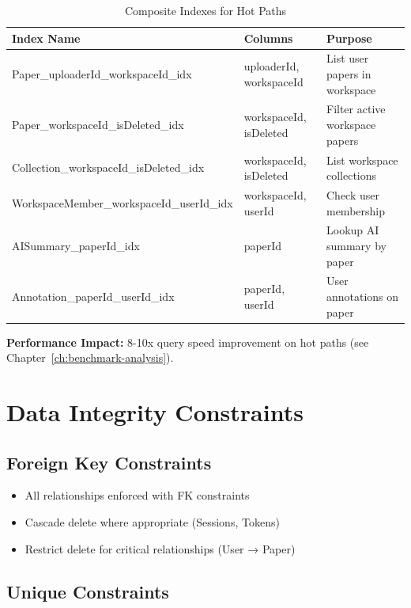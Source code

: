 \begin{table}[H]
\centering
\caption{Composite Indexes for Hot Paths}
\label{tab:erd-indexes}
\small
\begin{tabular}{@{}llp{5cm}@{}}
\toprule
\textbf{Index Name} & \textbf{Columns} & \textbf{Purpose} \\
\midrule
Paper\_uploaderId\_workspaceId\_idx & uploaderId, workspaceId & List user papers in workspace \\
Paper\_workspaceId\_isDeleted\_idx & workspaceId, isDeleted & Filter active workspace papers \\
Collection\_workspaceId\_isDeleted\_idx & workspaceId, isDeleted & List workspace collections \\
WorkspaceMember\_workspaceId\_userId\_idx & workspaceId, userId & Check user membership \\
AISummary\_paperId\_idx & paperId & Lookup AI summary by paper \\
Annotation\_paperId\_userId\_idx & paperId, userId & User annotations on paper \\
\bottomrule
\end{tabular}
\end{table}

\noindent
\textbf{Performance Impact:} 8-10x query speed improvement on hot paths (see Chapter~\ref{ch:benchmark-analysis}).

\section{Data Integrity Constraints}
\label{sec:erd-integrity}

\subsection{Foreign Key Constraints}

\begin{itemize}[leftmargin=*]
    \item All relationships enforced with FK constraints
    \item Cascade delete where appropriate (Sessions, Tokens)
    \item Restrict delete for critical relationships (User → Paper)
\end{itemize}

\subsection{Unique Constraints}


